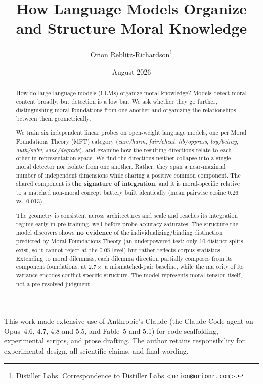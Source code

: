 \documentclass{article}
\title{How Language Models Organize and Structure Moral Knowledge}
\author{%
  Orion Reblitz-Richardson\thanks{%
    Distiller Labs. Correspondence to Distiller Labs
    \textless\texttt{orion@orionr.com}\textgreater.}
}
\date{August 2026}
\begin{document}
\maketitle

\begin{abstract}
How do large language models (LLMs) organize moral knowledge? Models
detect moral content broadly, but detection is a low bar. We ask
whether they go further, distinguishing moral foundations from one
another and organizing the relationships between them geometrically.

We train six independent linear probes on open-weight language models,
one per Moral Foundations Theory (MFT) category (\emph{care/harm},
\emph{fair/cheat}, \emph{lib/oppress}, \emph{loy/betray},
\emph{auth/subv}, \emph{sanc/degrade}), and examine how the resulting
directions relate to each other in representation space. We find the
directions neither collapse into a single moral detector nor isolate
from one another. Rather, they span a near-maximal number of
independent dimensions while sharing a positive common component. The
shared component is \textbf{the signature of integration}, and it is
moral-specific relative to a matched non-moral concept battery built
identically (mean pairwise cosine 0.26 vs.\ 0.013).

The geometry is consistent across architectures and scale and reaches
its integration regime early in pre-training, well before probe
accuracy saturates. The structure the model discovers shows
\textbf{no evidence} of the individualizing/binding distinction
predicted by Moral Foundations Theory (an underpowered test: only 10 distinct splits exist, so it cannot reject at the 0.05 level) but rather reflects corpus statistics.
Extending to moral dilemmas, each dilemma direction partially composes
from its component foundations, at $2.7\times$ a mismatched-pair
baseline, while the majority of its variance encodes conflict-specific
structure. The model represents moral tension itself, not a
pre-resolved judgment.
\end{abstract}








\begin{ack}
This work made extensive use of Anthropic's Claude (the Claude Code agent on
Opus~4.6, 4.7, 4.8 and 5.5, and Fable~5 and 5.1) for code scaffolding, experimental scripts, and
prose drafting. The author retains responsibility for experimental design, all
scientific claims, and final wording.
\end{ack}
\end{document}
